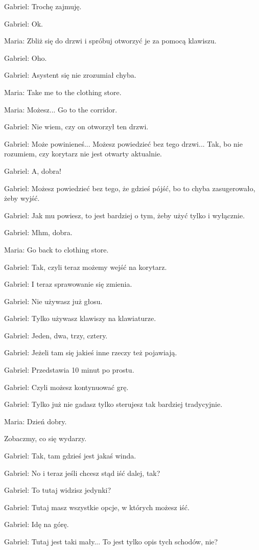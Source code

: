 Gabriel: Trochę zajmuję.

Gabriel: Ok.

Maria: Zbliż się do drzwi i spróbuj otworzyć je za pomocą klawiszu.

Gabriel: Oho.

Gabriel: Asystent się nie zrozumiał chyba.

Maria: Take me to the clothing store.

Maria: Możesz... Go to the corridor.

Gabriel: Nie wiem, czy on otworzył ten drzwi.

Gabriel: Może powinieneś... Możesz powiedzieć bez tego drzwi... Tak, bo nie rozumiem, czy korytarz nie jest otwarty aktualnie.

Gabriel: A, dobra!

Gabriel: Możesz powiedzieć bez tego, że gdzieś pójść, bo to chyba zasugerowało, żeby wyjść.

Gabriel: Jak mu powiesz, to jest bardziej o tym, żeby użyć tylko i wyłącznie.

Gabriel: Mhm, dobra.

Maria: Go back to clothing store.

Gabriel: Tak, czyli teraz możemy wejść na korytarz.

Gabriel: I teraz sprawowanie się zmienia.

Gabriel: Nie używasz już głosu.

Gabriel: Tylko używasz klawiszy na klawiaturze.

Gabriel: Jeden, dwa, trzy, cztery.

Gabriel: Jeżeli tam się jakieś inne rzeczy też pojawiają.

Gabriel: Przedstawia 10 minut po prostu.

Gabriel: Czyli możesz kontynuować grę.

Gabriel: Tylko już nie gadasz tylko sterujesz tak bardziej tradycyjnie.

Maria: Dzień dobry.

Zobaczmy, co się wydarzy.

Gabriel: Tak, tam gdzieś jest jakaś winda.

Gabriel: No i teraz jeśli chcesz stąd iść dalej, tak?

Gabriel: To tutaj widzisz jedynki?

Gabriel: Tutaj masz wszystkie opcje, w których możesz iść.

Gabriel: Idę na górę.

Gabriel: Tutaj jest taki mały... To jest tylko opis tych schodów, nie?


